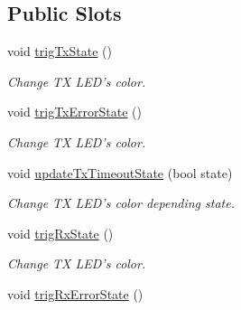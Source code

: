 \subsection*{Public Slots}
\begin{DoxyCompactItemize}
\item 
\hypertarget{classmdt_serial_port_ctl_widget_adab8eba8a36782a9fbf4fa3b9fd848b0}{
void \hyperlink{classmdt_serial_port_ctl_widget_adab8eba8a36782a9fbf4fa3b9fd848b0}{trigTxState} ()}
\label{classmdt_serial_port_ctl_widget_adab8eba8a36782a9fbf4fa3b9fd848b0}

\begin{DoxyCompactList}\small\item\em Change TX LED's color. \end{DoxyCompactList}\item 
\hypertarget{classmdt_serial_port_ctl_widget_a0c9ceed20ee727cfd1ef1ee971460fd1}{
void \hyperlink{classmdt_serial_port_ctl_widget_a0c9ceed20ee727cfd1ef1ee971460fd1}{trigTxErrorState} ()}
\label{classmdt_serial_port_ctl_widget_a0c9ceed20ee727cfd1ef1ee971460fd1}

\begin{DoxyCompactList}\small\item\em Change TX LED's color. \end{DoxyCompactList}\item 
\hypertarget{classmdt_serial_port_ctl_widget_a79cd97b8359da815298c99e6b90bc147}{
void \hyperlink{classmdt_serial_port_ctl_widget_a79cd97b8359da815298c99e6b90bc147}{updateTxTimeoutState} (bool state)}
\label{classmdt_serial_port_ctl_widget_a79cd97b8359da815298c99e6b90bc147}

\begin{DoxyCompactList}\small\item\em Change TX LED's color depending state. \end{DoxyCompactList}\item 
\hypertarget{classmdt_serial_port_ctl_widget_a739adf036e346577549a1a5e0dbcec2f}{
void \hyperlink{classmdt_serial_port_ctl_widget_a739adf036e346577549a1a5e0dbcec2f}{trigRxState} ()}
\label{classmdt_serial_port_ctl_widget_a739adf036e346577549a1a5e0dbcec2f}

\begin{DoxyCompactList}\small\item\em Change TX LED's color. \end{DoxyCompactList}\item 
\hypertarget{classmdt_serial_port_ctl_widget_a8490db062b6226b4c26ef1a85afc75bd}{
void \hyperlink{classmdt_serial_port_ctl_widget_a8490db062b6226b4c26ef1a85afc75bd}{trigRxErrorState} ()}
\label{classmdt_serial_port_ctl_widget_a8490db062b6226b4c26ef1a85afc75bd}


\end{DoxyCompactItemize}
